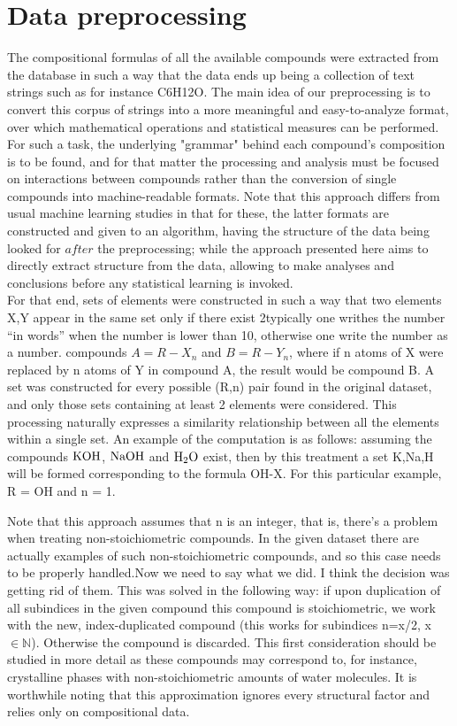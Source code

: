 \documentclass[]{article}
\newcommand{\gr}[1]{{\color{red}#1}}
\begin{document}
\section{Data preprocessing}
\label{sec:sec2}

The compositional formulas of all the available compounds were extracted from the database in such a way that the data ends up being a collection of text strings such as for instance C6H12O. The main idea of our preprocessing is to convert this corpus of strings into a more meaningful and easy-to-analyze format, over which mathematical operations and statistical measures can be performed. For such a task, the underlying "grammar" behind each compound's composition is to be found, and for that matter the processing and analysis must be focused on interactions between compounds rather than the conversion of single compounds into machine-readable formats. Note that this approach differs from usual machine learning studies in that for these, the latter formats are constructed and given to an algorithm, having the structure of the data being looked for $\textit{after}$ the preprocessing; while the  approach presented here aims to directly extract structure from the data, allowing to make analyses and conclusions before any statistical learning is invoked.\\

For that end, sets of elements were constructed in such a way that two elements X,Y appear in the same set only if there exist 2\gr{typically one writhes the number ``in words'' when the number is lower than 10, otherwise one write the number as a number.} compounds $A = R-X_n$ and $B = R-Y_n$, where if n atoms of X were replaced by n atoms of Y in compound A, the result would be compound B. A set was constructed for every possible (R,n) pair found in the original dataset, and only those sets containing at least 2 elements were considered. This processing naturally expresses a similarity relationship between all the elements within a single set. An example of the computation is as follows: assuming the compounds $\ce{KOH}$, $\ce{NaOH}$ and $\ce{H2O}$ exist, then by this treatment a set {K,Na,H} will be formed corresponding to the formula OH-X. For this particular example, R = OH and n = 1.

Note that this approach assumes that n is an integer, that is, there's a problem when treating non-stoichiometric compounds. In the given dataset there are actually examples of such non-stoichiometric compounds, and so this case needs to be properly handled.\gr{Now we need to say what we did.  I think the decision was getting rid of them.} This was solved in the following way: if upon duplication of all subindices in the given compound this compound is stoichiometric, we work with the new, index-duplicated compound (this works for subindices n=x/2, x $\in \mathbb{N}$). Otherwise the compound is discarded. This first consideration should be studied in more detail as these compounds may correspond to, for instance, crystalline phases with non-stoichiometric amounts of water molecules.
It is worthwhile noting that this approximation ignores every structural factor and relies only on compositional data.
\end{document}
